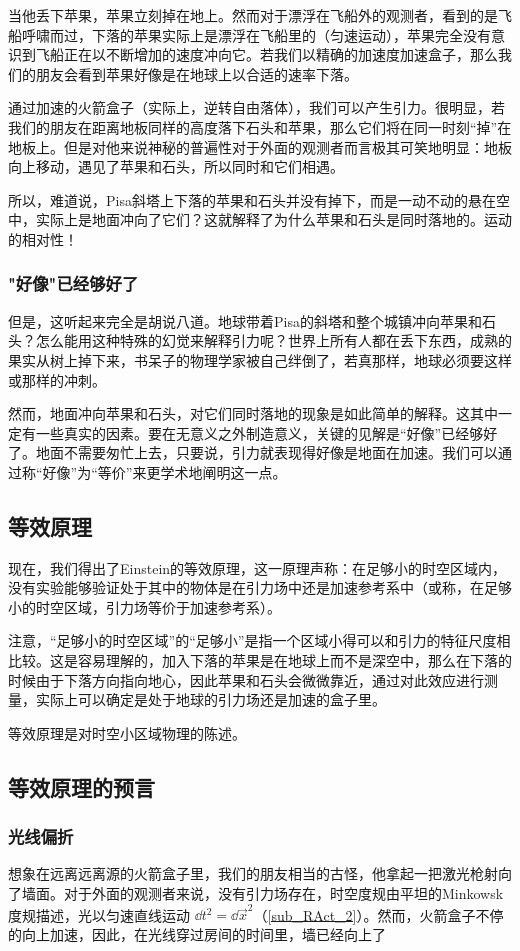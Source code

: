 当他丢下苹果，苹果立刻掉在地上。然而对于漂浮在飞船外的观测者，看到的是飞船呼啸而过，下落的苹果实际上是漂浮在飞船里的（匀速运动），苹果完全没有意识到飞船正在以不断增加的速度冲向它。若我们以精确的加速度加速盒子，那么我们的朋友会看到苹果好像是在地球上以合适的速率下落。

通过加速的火箭盒子（实际上，逆转自由落体），我们可以产生引力。很明显，若我们的朋友在距离地板同样的高度落下石头和苹果，那么它们将在同一时刻“掉”在地板上。但是对他来说神秘的普遍性对于外面的观测者而言极其可笑地明显：地板向上移动，遇见了苹果和石头，所以同时和它们相遇。

所以，难道说，Pisa斜塔上下落的苹果和石头并没有掉下，而是一动不动的悬在空中，实际上是地面冲向了它们？这就解释了为什么苹果和石头是同时落地的。运动的相对性！

\subsubsection{"好像"已经够好了}
但是，这听起来完全是胡说八道。地球带着Pisa的斜塔和整个城镇冲向苹果和石头？怎么能用这种特殊的幻觉来解释引力呢？世界上所有人都在丢下东西，成熟的果实从树上掉下来，书呆子的物理学家被自己绊倒了，若真那样，地球必须要这样或那样的冲刺。

然而，地面冲向苹果和石头，对它们同时落地的现象是如此简单的解释。这其中一定有一些真实的因素。要在无意义之外制造意义，关键的见解是“好像”已经够好了。地面不需要匆忙上去，只要说，引力就表现得好像是地面在加速。我们可以通过称“好像”为“等价”来更学术地阐明这一点。


\subsection{等效原理}
现在，我们得出了Einstein的等效原理，这一原理声称：在足够小的时空区域内，没有实验能够验证处于其中的物体是在引力场中还是加速参考系中（或称，在足够小的时空区域，引力场等价于加速参考系）。

注意，“足够小的时空区域”的“足够小”是指一个区域小得可以和引力的特征尺度相比较。这是容易理解的，加入下落的苹果是在地球上而不是深空中，那么在下落的时候由于下落方向指向地心，因此苹果和石头会微微靠近，通过对此效应进行测量，实际上可以确定是处于地球的引力场还是加速的盒子里。

等效原理是对时空小区域物理的陈述。

\subsection{等效原理的预言}

\subsubsection{光线偏折}
想象在远离远离源的火箭盒子里，我们的朋友相当的古怪，他拿起一把激光枪射向了墙面。对于外面的观测者来说，没有引力场存在，时空度规由平坦的Minkowsk度规描述，光以匀速直线运动 $\dd t^2=\dd{\vec x}^2$（\autoref{sub_RAct_2}）。然而，火箭盒子不停的向上加速，因此，在光线穿过房间的时间里，墙已经向上了



